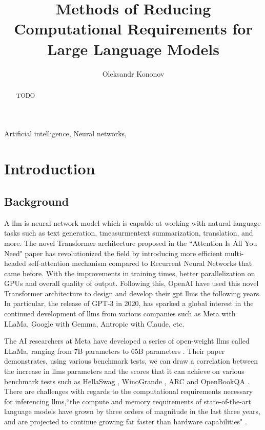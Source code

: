 \documentclass{ifacconf}
\begin{document}
	
	\begin{frontmatter}
		
		\title{Methods of Reducing Computational Requirements for Large Language Models} 
		
		\author[First]{Oleksandr Kononov} 
		
		\address[First]{South East Technological University, 
			Cork Road, Waterford, Ireland (e-mail: 20071032@mail.wit.ie).}
		\begin{abstract}                %
			TODO
		\end{abstract}
		
		\begin{keyword}
			Artificial intelligence, Neural networks, 
		\end{keyword}
		
	\end{frontmatter}
	\section{Introduction}
	\subsection{Background}
	A \gls{llm} is neural network model which is capable at working with natural language tasks such as text generation, tmeasurmentext summarization, translation, and more. The novel Transformer architecture proposed in the ``Attention Is All You Need" paper \cite{vaswani2017attentionneed} has revolutionized the field by introducing more efficient multi-headed self-attention mechanism compared to Recurrent Neural Networks that came before. With the improvements in training times, better parallelization on GPUs and overall quality of output.
	Following this, OpenAI have used this novel Transformer architecture to design and develop their \gls{gpt} \glspl{llm} the following years. In particular, the release of GPT-3 in 2020, has sparked a global interest in the continued development of \glspl{llm} from various companies such as Meta with LLaMa, Google with Gemma, Antropic with Claude, etc.
	
	The AI researchers at Meta have developed a series of open-weight \glspl{llm} called LLaMa, ranging from 7B parameters to 65B parameters \cite{touvron2023llamaopenefficientfoundation}. Their paper demonstrates, using various benchmark tests, we can draw a correlation between the increase in \glspl{llm} parameters and the scores that it can achieve on various benchmark tests such as HellaSwag \cite{zellers2019hellaswagmachinereallyfinish}, WinoGrande \cite{sakaguchi2019winograndeadversarialwinogradschema}, ARC \cite{clark2018thinksolvedquestionanswering} and OpenBookQA \cite{mihaylov2018suitarmorconductelectricity}. There are challenges with regards to the computational requirements necessary for inferencing \glspl{llm},``the compute and memory requirements of state-of-the-art language models have grown by three orders of magnitude in the last three years, and are projected to continue growing far faster than hardware capabilities" \cite[p.~97]{bommasani2022opportunitiesrisksfoundationmodels}.
	
\end{document}
